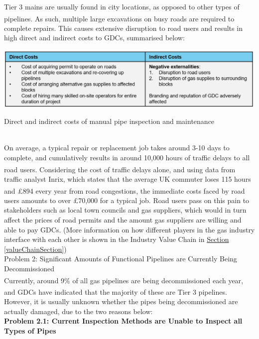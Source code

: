 \documentclass[11pt]{article}		%
\newcommand{\supercite}[1]{\textsuperscript{\cite{#1}}}		%
\newcommand{\sectref}[1]{\hyperref[#1]{Section \ref*{#1}}}     %
\begin{document}
    Tier 3 mains are usually found in city locations, as opposed to other types of pipelines\supercite{tier3hse}. As such, multiple large excavations on busy roads are required to complete repairs. This causes extensive disruption to road users and results in high direct and indirect costs to GDCs, summarised below:
    		\begin{table}[h]
			\centering
			\includegraphics[width=\textwidth]{costs.jpg}
			\caption{Direct and indirect costs of manual pipe inspection and maintenance}
			\label{PipeInspectionCosts}
 		\end{table}
 	\vspace{-0.5cm}
 	\\
    \hspace*{3ex}On average, a typical repair or replacement job takes around 3-10 days to complete, and cumulatively results in around 10,000 hours of traffic delays to all road users\supercite{pipeinspection}. Considering the cost of traffic delays alone, and using data from traffic analyst Inrix, which states that the average UK commuter loses 115 hours and £894 every year from road congestions\supercite{trafficreport}, the immediate costs faced by road users amounts to over £70,000 for a typical job. Road users pass on this pain to stakeholders such as local town councils and gas suppliers, which would in turn affect the prices of road permits and the amount gas suppliers are willing and able to pay GDCs. (More information on how different players in the gas industry interface with each other is shown in the Industry Value Chain in \sectref{valueChainSection})
 	\\
    {Problem 2: Significant Amounts of Functional Pipelines are Currently Being Decommissioned}
    \\
    Currently, around 9\% of all gas pipelines are being decommissioned each year\supercite{decommission}, and GDCs have indicated that the majority of these are Tier 3 pipelines\supercite{decommission}. However, it is usually unknown whether the pipes being decommissioned are actually damaged, due to the two reasons below:
	\\
	\textbf{Problem 2.1: Current Inspection Methods are Unable to Inspect all Types of Pipes }
\end{document}
